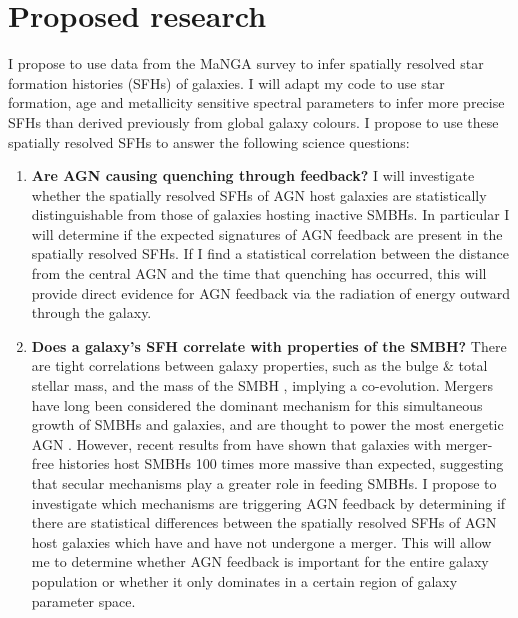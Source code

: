 \documentclass[11pt]{article}
\begin{document}
\vspace{-0.5em}
\section*{\large Proposed research}
\vspace{-0.5em}

I propose to use data from the MaNGA survey to infer spatially resolved star formation histories (SFHs) of galaxies. I will adapt my code to use star formation, age and metallicity sensitive spectral parameters %
to infer more precise SFHs than derived previously from global galaxy colours. I propose to use these spatially resolved SFHs to answer the following science questions:

\begin{enumerate}[leftmargin=*]

\item {\bf Are AGN causing quenching through feedback?} I will investigate whether the spatially resolved SFHs of AGN host galaxies are statistically distinguishable from those of galaxies hosting inactive SMBHs. In particular I will determine if the expected signatures of AGN feedback are present in the spatially resolved SFHs. If I find a statistical correlation between the distance from the central AGN and the time that quenching has occurred, this will provide direct evidence for AGN feedback via the radiation of energy outward through the galaxy.

\item {\bf Does a galaxy's SFH correlate with properties of the SMBH?} There are tight correlations between galaxy properties, such as the bulge \& total stellar mass, and the mass of the SMBH \citep{haring04}, implying a co-evolution. Mergers have long been considered the dominant mechanism for this simultaneous growth of SMBHs and galaxies, and are thought to power the most energetic AGN \citep{hopkins08, treister12}. However, recent results from \citet[]{simmons17} have shown that galaxies with merger-free histories host SMBHs 100 times more massive than expected, suggesting that secular mechanisms play a greater role in feeding SMBHs. I propose to investigate which mechanisms are triggering AGN feedback by determining if there are statistical differences between the spatially resolved SFHs of AGN host galaxies which have and have not undergone a merger. This will allow me to determine whether AGN feedback is important for the entire galaxy population or whether it only dominates in a certain region of galaxy parameter space. 

\end{enumerate}
\end{document}
